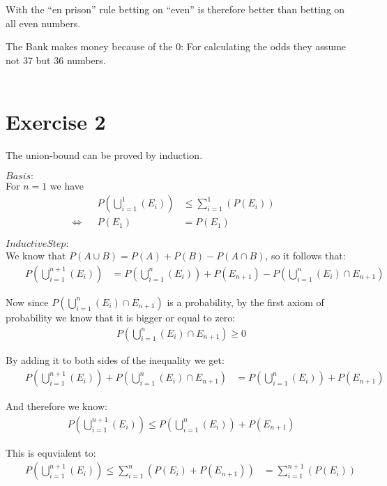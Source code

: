 \documentclass{article}
\begin{document}
With the ``en prison'' rule betting on ``even'' is therefore better than betting on all even numbers.

\noindent {}

The Bank makes money because of the $0$: For calculating the odds they assume not 37 but 36 numbers.
\\
\\
\setcounter{equation}{0}
\section*{Exercise 2}
The union-bound can be proved by induction.

\noindent $Basis:$ \\ For $n=1$ we have
\begin{align}
& & P(\bigcup_{i=1}^{1}(E_i)) & \leq \sum_{i=1}^{1}(P(E_i)) & & \\
\Leftrightarrow & & P(E_1) & = P(E_1) & & 
\end{align}

\noindent $Inductive Step:$ \\
We know that $P(A \cup B) = P(A) + P(B) - P(A \cap B)$, so it follows that:
\begin{align}
& & P(\bigcup_{i=1}^{n+1}(E_i)) & = P(\bigcup_{i=1}^{n}(E_i)) + P(E_{n+1}) - P(\bigcup_{i=1}^{n}(E_i) \cap E_{n+1}) & &
\end{align}

\noindent Now since $P(\bigcup_{i=1}^{n}(E_i) \cap E_{n+1})$ is a probability, by the first axiom of probability we know that it is bigger or equal to zero:
\begin{align}
 P(\bigcup_{i=1}^{n}(E_i) \cap E_{n+1}) \geq 0 
\end{align}

\noindent By adding it to both sides of the inequality we get:
\begin{align}
& & P(\bigcup_{i=1}^{n+1}(E_i)) + P(\bigcup_{i=1}^{n}(E_i) \cap E_{n+1}) & = P(\bigcup_{i=1}^{n}(E_i)) + P(E_{n+1})  & &
\end{align}

\noindent And therefore we know:
\begin{align}
& & P(\bigcup_{i=1}^{n+1}(E_i)) \leq P(\bigcup_{i=1}^{n}(E_i)) + P(E_{n+1})  & &
\end{align}

\noindent This is equvialent to:
\begin{align}
& & P(\bigcup_{i=1}^{n+1}(E_i)) \leq \sum_{i=1}^{n}(P(E_i) + P(E_{n+1})) & = \sum_{i=1}^{n+1}(P(E_i)) & &
\end{align}
\end{document}

